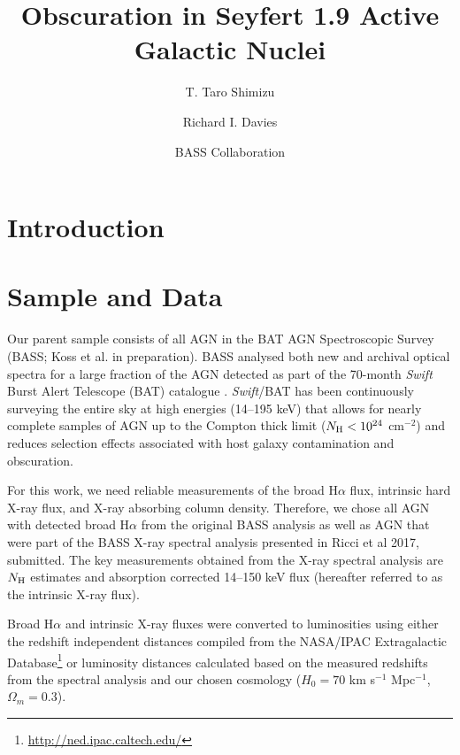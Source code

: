 \documentclass[twocolumn,trackchanges]{aastex61}
\newcommand{\halpha}{H$\alpha$}
\newcommand{\nh}{$N_{\rm H}$}
\begin{document}
\title{Obscuration in Seyfert 1.9 Active Galactic Nuclei}
\author[0000-0002-2125-4670]{T. Taro Shimizu}
\author{Richard I. Davies}
\author{BASS Collaboration}

\begin{abstract}
\end{abstract}


\section{Introduction}\label{sec:intro}
\section{Sample and Data}\label{sec:data}
Our parent sample consists of all AGN in the BAT AGN Spectroscopic Survey (BASS; Koss et al. in preparation). BASS analysed both new and archival optical spectra for a large fraction  of the AGN detected as part of the 70-month \textit{Swift} Burst Alert Telescope (BAT) \citep{Gehrels:2004qf, Barthelmy:2005ul} catalogue \citep{Baumgartner:2013fq}. \textit{Swift}/BAT has been continuously surveying the entire sky at high energies (14--195 keV) that allows for nearly complete samples of AGN up to the Compton thick limit ($N_{\rm H} < 10^{24}$ cm$^{-2}$) and reduces selection effects associated with host galaxy contamination and obscuration.

For this work, we need reliable measurements of the broad \halpha{} flux, intrinsic hard X-ray flux, and X-ray absorbing column density. Therefore, we chose all AGN with detected broad \halpha{} from the original BASS analysis as well as AGN that were part of the BASS X-ray spectral analysis presented in Ricci et al 2017, submitted. The key measurements obtained from the X-ray spectral analysis are \nh{} estimates and absorption corrected 14--150 keV flux (hereafter referred to as the intrinsic X-ray flux). 

Broad \halpha{} and intrinsic X-ray fluxes were converted to luminosities using either the redshift independent distances compiled from the NASA/IPAC Extragalactic Database\footnote{\url{http://ned.ipac.caltech.edu/}} or luminosity distances calculated based on the measured redshifts from the spectral analysis and our chosen cosmology ($H_{0}=70$ km s$^{-1}$ Mpc$^{-1}$, $\Omega_{m} = 0.3$).
\end{document}
